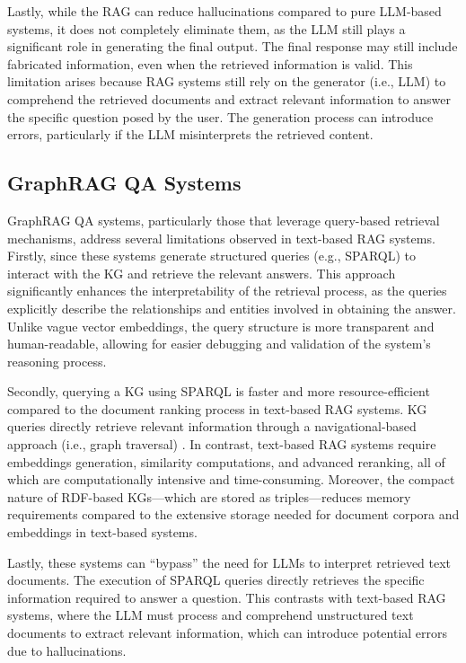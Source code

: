 Lastly, while the RAG can reduce hallucinations compared to pure LLM-based
systems, it does not completely eliminate them, as the LLM still plays
a significant role in generating the final output. The final response
may still include fabricated information, even when the retrieved information
is valid. This limitation arises because RAG systems still rely on the generator (i.e., LLM) to 
comprehend the retrieved documents and extract relevant information to 
answer the specific question posed by the user. The generation process can 
introduce errors, particularly if the LLM misinterprets 
the retrieved content.

\subsection{GraphRAG QA Systems}
GraphRAG QA systems, particularly those that leverage query-based 
retrieval mechanisms, address several limitations observed in 
text-based RAG systems.
Firstly, since these systems generate structured queries (e.g., SPARQL) 
to interact with the KG and retrieve the relevant answers. This approach
significantly enhances the interpretability of the retrieval process, 
as the queries explicitly describe the relationships and entities
involved in obtaining the answer. Unlike vague vector embeddings, 
the query structure is more transparent and human-readable, 
allowing for easier debugging and validation of the system's 
reasoning process.

Secondly, querying a KG using SPARQL is faster and more resource-efficient
compared to the document ranking process in text-based RAG systems.
KG queries directly retrieve relevant information through a navigational-based
approach (i.e., graph traversal) \citep{rdf-sws}. In contrast, 
text-based RAG systems require embeddings generation, similarity 
computations, and advanced reranking, all of which are computationally 
intensive and time-consuming. Moreover, the compact nature of RDF-based KGs---which are 
stored as triples---reduces memory requirements compared to the 
extensive storage needed for document corpora and embeddings in 
text-based systems.

Lastly, these systems can ``bypass'' the need for LLMs to interpret
retrieved text documents. The execution of SPARQL queries directly
retrieves the specific information required to answer a question.
This contrasts with text-based RAG systems, where the LLM must process
and comprehend unstructured text documents to extract relevant information, 
which can introduce potential errors due to hallucinations.

